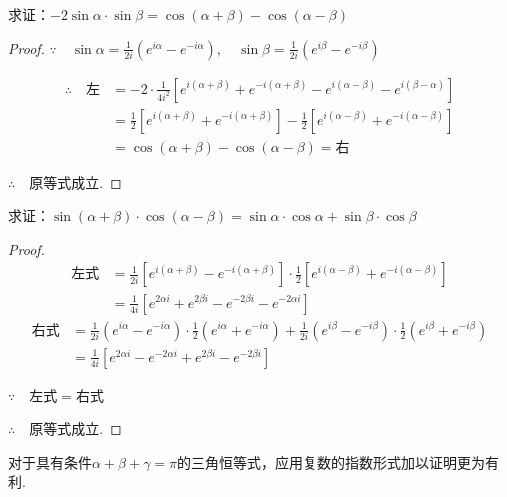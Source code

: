 \begin{example}
求证：$-2\sin\alpha\cdot \sin\beta=\cos(\alpha+\beta)-\cos(\alpha-\beta)$    
\end{example}

\begin{proof}
$\because\quad \sin\alpha=\frac{1}{2i}\left(e^{i\alpha}-e^{-i\alpha}\right),\quad \sin\beta=\frac{1}{2i}\left(e^{i\beta}-e^{-i\beta}\right)$

\[\begin{split}
\therefore\quad \text{左}&=-2\cdot \frac{1}{4i^2}\left[e^{i(\alpha+\beta)}+e^{-i(\alpha+\beta)}-e^{i(\alpha-\beta)}-e^{i(\beta-\alpha)}\right]\\
&=\frac{1}{2}\left[e^{i(\alpha+\beta)}+e^{-i(\alpha+\beta)}\right]-\frac{1}{2}\left[e^{i(\alpha-\beta)}+e^{-i(\alpha-\beta)}\right]\\
&=\cos(\alpha+\beta)-\cos(\alpha-\beta)=\text{右}
\end{split}\]

$\therefore\quad $原等式成立.
\end{proof}

\begin{example}
求证：$\sin(\alpha+\beta)\cdot \cos(\alpha-\beta)=\sin\alpha\cdot \cos\alpha+\sin\beta\cdot \cos\beta$
\end{example}

\begin{proof}
\[\begin{split}
\text{左式}&=\frac{1}{2i}\left[e^{i(\alpha+\beta)}-e^{-i(\alpha+\beta)}\right]\cdot \frac{1}{2}\left[e^{i(\alpha-\beta)}+e^{-i(\alpha-\beta)}\right]\\
&=\frac{1}{4i}\left[e^{2\alpha i}+e^{2\beta i}-e^{-2\beta i}-e^{-2\alpha i}\right]
\end{split}\]
\[\begin{split}
    \text{右式}&=\frac{1}{2i}\left(e^{i\alpha}-e^{-i\alpha}\right)\cdot\frac{1}{2}\left(e^{i\alpha}+e^{-i\alpha}\right)+\frac{1}{2i}\left(e^{i\beta}-e^{-i\beta}\right)\cdot \frac{1}{2}\left(e^{i\beta}+e^{-i\beta}\right)\\
    &=\frac{1}{4i}\left[e^{2\alpha i}-e^{-2\alpha i}+e^{2\beta i}-e^{-2\beta i}\right]
\end{split}\]

$\because\quad $左式$=$右式

$\therefore\quad $原等式成立.
\end{proof}

对于具有条件$\alpha+\beta+\gamma=\pi$的三角恒等式，应用复数的指数形式加以证明更为有利.

